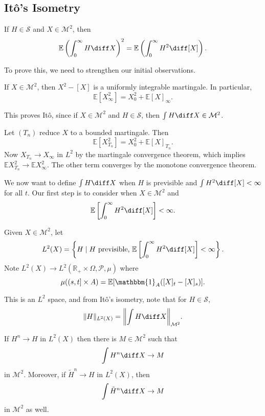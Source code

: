 \documentclass[12pt]{article}
\begin{document}
\subsection{It\^o's Isometry}%
\label{sub:ii}

\begin{proposition}
	If $H \in \mathcal{S}$ and $X \in \mathcal{M}^2$, then
	\[
		\mathbb{E} \left( \int_0^\infty H \diff X\right)^2 = \mathbb{E} \left( \int_0^\infty H^2 \diff [X] \right).
	\]
\end{proposition}

To prove this, we need to strengthen our initial observations.

\begin{proposition}
	If $X \in \mathcal{M}^2$, then $X^2 - [X]$ is a uniformly integrable martingale. In particular,
	\[
		\mathbb{E}[X_\infty^2]= X_0^2 + \mathbb{E} [X]_\infty.
	\]
\end{proposition}

This proves It\^o, since if $X \in \mathcal{M}^2$ and $H \in \mathcal{S}$, then $\int H \diff X \in \mathcal{M}^2$.

\begin{proofbox}
	Let $(T_n)$ reduce $X$ to a bounded martingale. Then
	\[
		\mathbb{E}[X_{T_n}^2] = X_0^2 + \mathbb{E} [X]_{T_n}.
	\]
	Now $X_{T_n} \to X_\infty$ in $L^2$ by the martingale convergence theorem, which implies $\mathbb{E} X_{T_n}^2 \to \mathbb{E} X_\infty^2$. The other term converges by the monotone convergence theorem.
\end{proofbox}


We now want to define $\int H \diff X$ when $H$ is previsible and $\int H^2 \diff [X] < \infty$ for all $t$. Our first step is to consider when $X \in \mathcal{M}^2$ and
\[
	\mathbb{E}\left[ \int_0^\infty H^2 \diff [X] \right] < \infty.
\]
\begin{definition}
	Given $X \in \mathcal{M}^2$, let
	\[
		L^2(X) = \left\{ H \mid H\text{ previsible, } \mathbb{E}\left[ \int_0^\infty H^2 \diff [X] \right] < \infty \right\}.
	\]
	Note $L^2(X) \to L^2(\mathbb{R}_+ \times \Omega, \mathcal{P}, \mu)$ where
	\[
		\mu((s, t] \times A) = \mathbb{E}[\mathbbm{1}_{A} ([X]_t - [X]_s)].
	\]
\end{definition}

This is an $L^2$ space, and from It\^o's isometry, note that for $H \in \mathcal{S}$,
\[
\|H\|_{L^2(X)} = \biggl\|\int H \diff X\biggr\|_{\mathcal{M}^2}.
\]
\begin{proposition}
	If $H^{n} \to H$ in $L^2(X)$ then there is $M \in \mathcal{M}^2$ such that
	\[
	\int H^{n} \diff X \to M
	\]
	in $\mathcal{M}^2$. Moreover, if $\tilde H^{n} \to H$ in $L^2(X)$, then
	\[
	\int \tilde H^{n} \diff X \to M
	\]
	in $\mathcal{M}^2$ as well.
\end{proposition}
\end{document}
